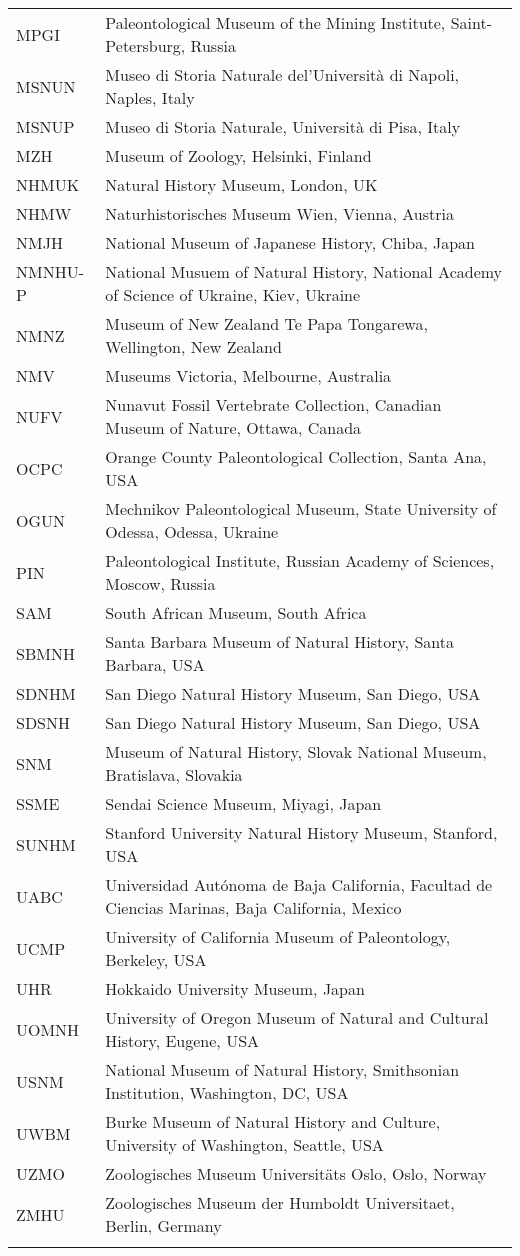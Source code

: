 \begin{longtable}{lp{}}
MPGI &
Paleontological Museum of the Mining Institute, Saint-Petersburg, Russia\\
MSNUN &
Museo di Storia Naturale del'Universit\`{a} di Napoli, Naples, Italy\\
MSNUP &
Museo di Storia Naturale, Universit\`{a} di Pisa, Italy\\
MZH & 
Museum of Zoology, Helsinki, Finland\\
NHMUK &
Natural History Museum, London, UK\\
NHMW &
Naturhistorisches Museum Wien, Vienna, Austria\\
NMJH &
National Museum of Japanese History, Chiba, Japan\\
NMNHU-P &
National Musuem of Natural History, National Academy of Science of Ukraine, Kiev, Ukraine\\
NMNZ &
Museum of New Zealand Te Papa Tongarewa, Wellington, New Zealand\\
NMV &
Museums Victoria, Melbourne, Australia\\
NUFV &
Nunavut Fossil Vertebrate Collection, Canadian Museum of Nature, Ottawa, Canada\\
OCPC &
Orange County Paleontological Collection, Santa Ana, USA\\
OGUN &
Mechnikov Paleontological Museum, State University of Odessa, Odessa, Ukraine\\
PIN &
Paleontological Institute, Russian Academy of Sciences, Moscow, Russia\\
SAM &
South African Museum, South Africa\\
SBMNH &
Santa Barbara Museum of Natural History, Santa Barbara, USA\\
SDNHM &
San Diego Natural History Museum, San Diego, USA\\
SDSNH &
San Diego Natural History Museum, San Diego, USA\\
SNM &
Museum of Natural History, Slovak National Museum, Bratislava, Slovakia\\
SSME &
Sendai Science Museum, Miyagi, Japan\\
SUNHM &
Stanford University Natural History Museum, Stanford, USA\\
UABC &
Universidad Aut\'{o}noma de Baja California, Facultad de Ciencias Marinas, Baja California, Mexico\\
UCMP &
University of California Museum of Paleontology, Berkeley, USA\\
UHR &
Hokkaido University Museum, Japan\\
UOMNH &
University of Oregon Museum of Natural and Cultural History, Eugene, USA\\
USNM &
National Museum of Natural History, Smithsonian Institution, Washington, DC, USA\\
UWBM &
Burke Museum of Natural History and Culture, University of Washington, Seattle, USA\\
UZMO &
Zoologisches Museum Universit\"{a}ts Oslo, Oslo, Norway\\
ZMHU &
Zoologisches Museum der Humboldt Universitaet, Berlin, Germany\\
\hline

\label{table-institutions}
\end{longtable}
